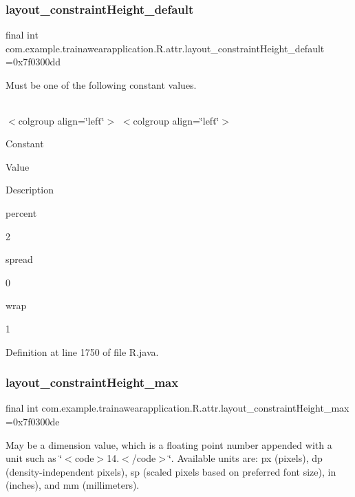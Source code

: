 \subsubsection{\texorpdfstring{layout\_constraintHeight\_default}{layout\_constraintHeight\_default}}
{\footnotesize\ttfamily final int com.\+example.\+trainawearapplication.\+R.\+attr.\+layout\+\_\+constraint\+Height\+\_\+default =0x7f0300dd\hspace{0.3cm}{\ttfamily [static]}}

Must be one of the following constant values.

\tabulinesep=1mm
\begin{longtabu}spread 0pt [c]{*{0}{|X[-1]}|}
\hline
\end{longtabu}
$<$colgroup align=\char`\"{}left\char`\"{}$>$ $<$colgroup align=\char`\"{}left\char`\"{}$>$ 

Constant

Value

Description 

percent

2

spread

0

wrap

1

Definition at line 1750 of file R.\+java.

\mbox{\label{classcom_1_1example_1_1trainawearapplication_1_1_r_1_1attr_a048a20d4f81ed64001ae31f0e603e1b1}} 
\subsubsection{\texorpdfstring{layout\_constraintHeight\_max}{layout\_constraintHeight\_max}}
{\footnotesize\ttfamily final int com.\+example.\+trainawearapplication.\+R.\+attr.\+layout\+\_\+constraint\+Height\+\_\+max =0x7f0300de\hspace{0.3cm}{\ttfamily [static]}}

May be a dimension value, which is a floating point number appended with a unit such as \char`\"{}$<$code$>$14.\+5sp$<$/code$>$\char`\"{}. Available units are\+: px (pixels), dp (density-\/independent pixels), sp (scaled pixels based on preferred font size), in (inches), and mm (millimeters). 

